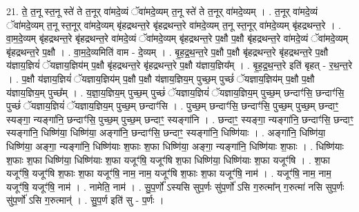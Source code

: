 \documentclass[17pt]{extarticle}
\begin{document}
21. ते॒ त॒नू स्त॒नू स्ते॑ ते त॒नूर् वा॑मदे॒व्यं ॅवा॑मदे॒व्यम् त॒नू स्ते॑ ते त॒नूर् वा॑मदे॒व्यम् । . त॒नूर् वा॑मदे॒व्यं ॅवा॑मदे॒व्यम् त॒नू स्त॒नूर् वा॑मदे॒व्यम् बृ॑हद्रथन्त॒रे बृ॑हद्रथन्त॒रे वा॑मदे॒व्यम् त॒नू स्त॒नूर् वा॑मदे॒व्यम् बृ॑हद्रथन्त॒रे । . वा॒म॒दे॒व्यम् बृ॑हद्रथन्त॒रे बृ॑हद्रथन्त॒रे वा॑मदे॒व्यं ॅवा॑मदे॒व्यम् बृ॑हद्रथन्त॒रे प॒क्षौ प॒क्षौ बृ॑हद्रथन्त॒रे वा॑मदे॒व्यं ॅवा॑मदे॒व्यम् बृ॑हद्रथन्त॒रे प॒क्षौ । . वा॒म॒दे॒व्यमिति॑ वाम - दे॒व्यम् । . बृ॒ह॒द्र॒थ॒न्त॒रे प॒क्षौ प॒क्षौ बृ॑हद्रथन्त॒रे बृ॑हद्रथन्त॒रे प॒क्षौ य॑ज्ञाय॒ज्ञियं॑ ॅयज्ञाय॒ज्ञिय॑म् प॒क्षौ बृ॑हद्रथन्त॒रे बृ॑हद्रथन्त॒रे प॒क्षौ य॑ज्ञाय॒ज्ञिय᳚म् । . बृ॒ह॒द्र॒थ॒न्त॒रे इति॑ बृहत् - र॒थ॒न्त॒रे । . प॒क्षौ य॑ज्ञाय॒ज्ञियं॑ ॅयज्ञाय॒ज्ञिय॑म् प॒क्षौ प॒क्षौ य॑ज्ञाय॒ज्ञिय॒म् पुच्छ॒म् पुच्छं॑ ॅयज्ञाय॒ज्ञिय॑म् प॒क्षौ प॒क्षौ य॑ज्ञाय॒ज्ञिय॒म् पुच्छ᳚म् । . य॒ज्ञा॒य॒ज्ञिय॒म् पुच्छ॒म् पुच्छं॑ ॅयज्ञाय॒ज्ञियं॑ ॅयज्ञाय॒ज्ञिय॒म् पुच्छ॒म् छन्दाꣳ॑सि॒ छन्दाꣳ॑सि॒ पुच्छं॑ ॅयज्ञाय॒ज्ञियं॑ ॅयज्ञाय॒ज्ञिय॒म् पुच्छ॒म् छन्दाꣳ॑सि । . पुच्छ॒म् छन्दाꣳ॑सि॒ छन्दाꣳ॑सि॒ पुच्छ॒म् पुच्छ॒म् छन्दाꣳ॒॒ स्यङ्गा॒ न्यङ्गा॑नि॒ छन्दाꣳ॑सि॒ पुच्छ॒म् पुच्छ॒म् छन्दाꣳ॒॒ स्यङ्गा॑नि । . छन्दाꣳ॒॒ स्यङ्गा॒ न्यङ्गा॑नि॒ छन्दाꣳ॑सि॒ छन्दाꣳ॒॒ स्यङ्गा॑नि॒ धिष्णि॑या॒ धिष्णि॑या॒ अङ्गा॑नि॒ छन्दाꣳ॑सि॒ छन्दाꣳ॒॒ स्यङ्गा॑नि॒ धिष्णि॑याः । . अङ्गा॑नि॒ धिष्णि॑या॒ धिष्णि॑या॒ अङ्गा॒ न्यङ्गा॑नि॒ धिष्णि॑याः श॒फाः श॒फा धिष्णि॑या॒ अङ्गा॒ न्यङ्गा॑नि॒ धिष्णि॑याः श॒फाः । . धिष्णि॑याः श॒फाः श॒फा धिष्णि॑या॒ धिष्णि॑याः श॒फा यजूꣳ॑षि॒ यजूꣳ॑षि श॒फा धिष्णि॑या॒ धिष्णि॑याः श॒फा यजूꣳ॑षि । . श॒फा यजूꣳ॑षि॒ यजूꣳ॑षि श॒फाः श॒फा यजूꣳ॑षि॒ नाम॒ नाम॒ यजूꣳ॑षि श॒फाः श॒फा यजूꣳ॑षि॒ नाम॑ । . यजूꣳ॑षि॒ नाम॒ नाम॒ यजूꣳ॑षि॒ यजूꣳ॑षि॒ नाम॑ । . नामेति॒ नाम॑ । . सु॒प॒र्णो᳚ ऽस्यसि सुप॒र्णः सु॑प॒र्णो॑ ऽसि ग॒रुत्मा᳚न् ग॒रुत्मा॑ नसि सुप॒र्णः सु॑प॒र्णो॑ ऽसि ग॒रुत्मान्॑ । . सु॒प॒र्ण इति॑ सु - प॒र्णः । \newline
\end{document}
